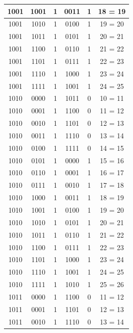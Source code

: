 \documentclass{exam}
\begin{document}
\begin{center}
\begin{longtable}{|c|c|c|c|c|c|}
                1001 & 1001 & 1 & 0011 & 1 & 18 = 19 \\ \hline
                1001 & 1010 & 1 & 0100 & 1 & 19 = 20 \\ \hline
                1001 & 1011 & 1 & 0101 & 1 & 20 = 21 \\ \hline
                1001 & 1100 & 1 & 0110 & 1 & 21 = 22 \\ \hline
                1001 & 1101 & 1 & 0111 & 1 & 22 = 23 \\ \hline
                1001 & 1110 & 1 & 1000 & 1 & 23 = 24 \\ \hline
                1001 & 1111 & 1 & 1001 & 1 & 24 = 25 \\ \hline
                1010 & 0000 & 1 & 1011 & 0 & 10 = 11 \\ \hline
                1010 & 0001 & 1 & 1100 & 0 & 11 = 12 \\ \hline
                1010 & 0010 & 1 & 1101 & 0 & 12 = 13 \\ \hline
                1010 & 0011 & 1 & 1110 & 0 & 13 = 14 \\ \hline
                1010 & 0100 & 1 & 1111 & 0 & 14 = 15 \\ \hline
                1010 & 0101 & 1 & 0000 & 1 & 15 = 16 \\ \hline
                1010 & 0110 & 1 & 0001 & 1 & 16 = 17 \\ \hline
                1010 & 0111 & 1 & 0010 & 1 & 17 = 18 \\ \hline
                1010 & 1000 & 1 & 0011 & 1 & 18 = 19 \\ \hline
                1010 & 1001 & 1 & 0100 & 1 & 19 = 20 \\ \hline
                1010 & 1010 & 1 & 0101 & 1 & 20 = 21 \\ \hline
                1010 & 1011 & 1 & 0110 & 1 & 21 = 22 \\ \hline
                1010 & 1100 & 1 & 0111 & 1 & 22 = 23 \\ \hline
                1010 & 1101 & 1 & 1000 & 1 & 23 = 24 \\ \hline
                1010 & 1110 & 1 & 1001 & 1 & 24 = 25 \\ \hline
                1010 & 1111 & 1 & 1010 & 1 & 25 = 26 \\ \hline
                1011 & 0000 & 1 & 1100 & 0 & 11 = 12 \\ \hline
                1011 & 0001 & 1 & 1101 & 0 & 12 = 13 \\ \hline
                1011 & 0010 & 1 & 1110 & 0 & 13 = 14 \\ \hline

\end{longtable}
\end{center}
\end{document}
